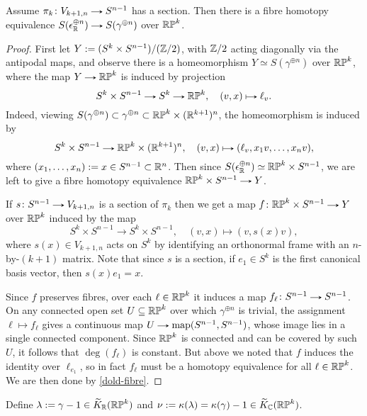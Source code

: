 \begin{lemma}
  \label{RP-reduction}
  Assume $\pi_k \c V_{k+1,n} \to S^{n-1}$ has a section. Then there
  is a fibre homotopy equivalence $S(\epsilon_\R^{\oplus n}) \to
  S(\gamma^{\oplus n})$ over $\mathbb{RP}^k$.
\end{lemma}

\begin{proof}
  First let $Y \mathrel{:=} (S^k \times S^{n-1})/(\mathbb{Z}/2)$, with $\mathbb{Z}/2$ acting
  diagonally via the antipodal maps, and observe there is a
  homeomorphism $Y \simeq S(\gamma^{\oplus n})$ over $\mathbb{RP}^k$, where the
  map $Y \to \RP^k$ is induced by projection
  \[
  S^k \times S^{n-1} \to S^k \to \RP^k, \quad (v,x) \mapsto \ell_v.
  \]
  Indeed, viewing $S(\gamma^{\oplus n}) \subset \gamma^{\oplus n}
  \subset \mathbb{RP}^k \times (\mathbb{R}^{k+1})^n$, the homeomorphism is induced by
  \[
  S^k \times S^{n-1} \to \RP^k \times (\R^{k+1})^n, \quad (v,x)
  \mapsto (\ell_v, x_1v, \ldots, x_nv),
  \]
  where $(x_1,\ldots,x_n) \mathrel{:=} x \in S^{n-1} \subset \mathbb{R}^n$. Then since
  $S(\epsilon_{\mathbb{R}}^{\oplus n}) \simeq \mathbb{RP}^k \times S^{n-1}$, we are
  left to give a fibre homotopy equivalence $\RP^k \times S^{n-1} \to
  Y$.

  If $s \c S^{n-1} \to V_{k+1,n}$ is a section of $\pi_k$ then we
  get a map $f \c \RP^k \times S^{n-1} \to Y$ over $\mathbb{RP}^k$ induced by
  the map
  \[
  S^k \times S^{n-1} \to S^k \times S^{n-1}, \quad (v,x) \mapsto
  (v, s(x)v),
  \]
  where $s(x) \in V_{k+1,n}$ acts on $S^k$ by identifying an
  orthonormal frame with an $n$-by-$(k+1)$ matrix. Note that since $s$
  is a section, if $e_1 \in S^k$ is the first canonical basis vector,
  then $s(x)e_1 = x$.

  Since $f$ preserves fibres, over each $\ell \in \mathbb{RP}^k$ it induces a
  map $f_\ell \c S^{n-1} \to S^{n-1}$. On any connected open set $U
  \subseteq \mathbb{RP}^k$ over which $\gamma^{\oplus n}$ is trivial, the
  assignment $\ell \mapsto f_\ell$ gives a continuous map $U \to
  \map(S^{n-1},S^{n-1})$, whose image lies in a single connected
  component. Since $\mathbb{RP}^k$ is connected and can be covered by such
  $U$, it follows that $\deg(f_\ell)$ is constant. But above we noted
  that $f$ induces the identity over $\ell_{e_1}$, so in fact $f_\ell$
  must be a homotopy equivalence for all $\ell \in \mathbb{RP}^k$. We are then
  done by \eqref{dold-fibre}.
\end{proof}

\begin{notation}
  \label{RP-notation}
  Define $\lambda \mathrel{:=} \gamma - 1 \in \widetilde K_{\mathbb{R}}(\mathbb{RP}^k)$ and $\nu \mathrel{:=}
  \kappa(\lambda) = \kappa(\gamma) - 1 \in \widetilde K_{\mathbb{C}}(\mathbb{RP}^k)$.
\end{notation}

